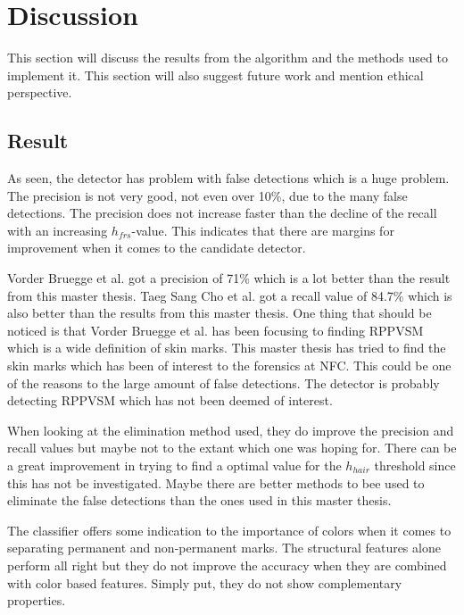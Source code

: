\chapter{Discussion}\label{cha:Discussion}

This section will discuss the results from the algorithm and the methods used to implement it. This section will also suggest future work and mention ethical perspective.  

\section{Result}

As seen, the detector has problem with false detections which is a huge problem. The precision is not very good, not even over 10\%, due to the many false detections. The precision does not increase faster than the decline of the recall with an increasing $h_{frs}$-value. This indicates that there are margins for improvement when it comes to the candidate detector.

Vorder Bruegge et al. \cite{automatic_detector_2015} got a precision of 71\% which is a lot better than the result from this master thesis. Taeg Sang Cho et al.\cite{reliable_mole} got a recall value of 84.7\% which is also better than the results from this master thesis. One thing that should be noticed is that Vorder Bruegge et al. has been focusing to finding RPPVSM which is a wide definition of skin marks. This master thesis has tried to find the skin marks which has been of interest to the forensics at NFC. This could be one of the reasons to the large amount of false detections. The detector is probably detecting RPPVSM which has not been deemed of interest.     

When looking at the elimination method used, they do improve the precision and recall values but maybe not to the extant which one was hoping for. There can be a great improvement in trying to find a optimal value for the $h_{hair}$ threshold since this has not be investigated. Maybe there are better methods to bee used to eliminate the false detections than the ones used in this master thesis.  

The classifier offers some indication to the importance of colors when it comes to separating permanent and non-permanent marks. The structural features alone perform all right but they do not improve the accuracy when they are combined with color based features. Simply put, they do not show complementary properties. 

